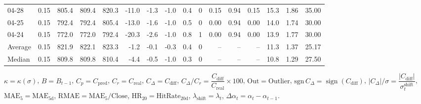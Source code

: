 \begin{threeparttable}
{\begin{tabular}{lrrrrrrrrrrrrrrr}
  04-28 &     0.15 & 805.4 & 809.4 & 820.3 &      -11.0 &           -1.3 &                     -1.0 &                 0.4 &              0 &       0.15 &      0.94 &           0.15 &             15.3 &            1.86 &                  35.00 \\
  04-25 &     0.15 & 792.4 & 792.4 & 805.4 &      -13.0 &           -1.6 &                     -1.0 &                 0.5 &              0 &       0.00 &      0.94 &           0.00 &             14.0 &            1.74 &                  30.00 \\
  04-24 &     0.15 & 772.0 & 772.0 & 792.4 &      -20.3 &           -2.6 &                     -1.0 &                 0.8 &              1 &       0.00 &      0.94 &           0.00 &             13.9 &            1.77 &                  30.00 \\
Average &     0.15 & 821.9 & 822.1 & 823.3 &       -1.2 &           -0.1 &                     -0.3 &                 0.4 &              0 &         -- &        -- &             -- &             11.3 &            1.37 &                  25.17 \\
 Median &     0.15 & 809.8 & 809.8 & 810.4 &       -4.4 &           -0.5 &                     -1.0 &                 0.3 &              0 &         -- &        -- &             -- &             10.8 &            1.29 &                  27.50 \\
\bottomrule
\end{tabular}
}
\begin{tablenotes}\footnotesize
\item $\kappa=\kappa(\sigma)$, $B=B_{t-1}$, $C_p=C_{\text{pred}}$, $C_r=C_{\text{real}}$, $C_\Delta=C_{\text{diff}}$, $C_\Delta/C_r=\dfrac{C_{\text{diff}}}{C_{\text{real}}}\times100$, $\mathrm{Out}=\text{Outlier}$, $\mathrm{sgn}\,C_\Delta=\operatorname{sign}(C_{\text{diff}})$, $|C_\Delta|/\sigma=\dfrac{|C_{\text{diff}}|}{\sigma_t^{\text{shift}}}$, $\mathrm{MAE}_5=\mathrm{MAE}_{5\text{d}}$, $\mathrm{RMAE}= \mathrm{MAE}_5 / \text{Close}$, $\mathrm{HR}_{20}=\mathrm{HitRate}_{20\text{d}}$, 
$\lambda_{\text{shift}}=\lambda_t$, 
$\Delta\alpha_t=\alpha_t-\alpha_{t-1}$.
\end{tablenotes}
\end{threeparttable}
\endgroup

